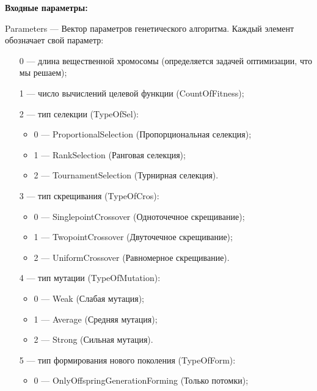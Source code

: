 \textbf{Входные параметры:}
 
Parameters --- Вектор параметров генетического алгоритма. Каждый элемент обозначает свой параметр:
 
 \begin{itemize}
 \item   [0] --- длина вещественной хромосомы (определяется задачей оптимизации, что мы решаем);
  \item   [1] --- число вычислений целевой функции (CountOfFitness);
  \item    [2] --- тип селекции (TypeOfSel):
 \begin{itemize}
       \item 0 --- ProportionalSelection (Пропорциональная селекция);
 
       \item 1 --- RankSelection (Ранговая селекция);
 
       \item 2 --- TournamentSelection (Турнирная селекция).
	    \end{itemize}
 
 \item [3] --- тип скрещивания (TypeOfCros):
  \begin{itemize}
       \item 0 --- SinglepointCrossover (Одноточечное скрещивание);
 
       \item 1 --- TwopointCrossover (Двуточечное скрещивание);
 
       \item 2 --- UniformCrossover (Равномерное скрещивание).
	    \end{itemize}
 
 \item [4] --- тип мутации (TypeOfMutation):
  \begin{itemize}
       \item 0 --- Weak (Слабая мутация);
 
       \item 1 --- Average (Средняя мутация);
 
       \item 2 --- Strong (Сильная мутация).
	    \end{itemize}
 
 \item [5] --- тип формирования нового поколения (TypeOfForm):
  \begin{itemize}
       \item 0 --- OnlyOffspringGenerationForming (Только потомки);
 

\end{itemize}
\end{itemize}
